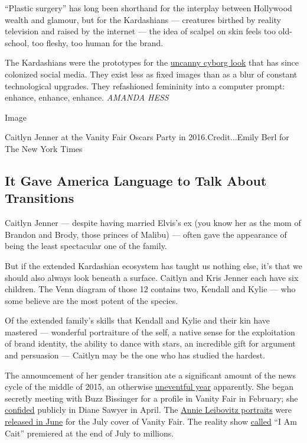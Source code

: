 ``Plastic surgery'' has long been shorthand for the interplay between
Hollywood wealth and glamour, but for the Kardashians --- creatures
birthed by reality television and raised by the internet --- the idea of
scalpel on skin feels too old-school, too fleshy, too human for the
brand.

The Kardashians were the prototypes for the
\href{https://www.nytimes3xbfgragh.onion/2018/02/04/arts/fembot-poppy-lil-miquela-kylie-jenner.html}{uncanny
cyborg look} that has since colonized social media. They exist less as
fixed images than as a blur of constant technological upgrades. They
refashioned femininity into a computer prompt: enhance, enhance,
enhance. \emph{AMANDA HESS}

Image

Caitlyn Jenner at the Vanity Fair Oscars Party in 2016.Credit...Emily
Berl for The New York Times

\hypertarget{it-gave-america-language-to-talk-about-transitions}{%
\subsection{It Gave America Language to Talk About
Transitions}\label{it-gave-america-language-to-talk-about-transitions}}

Caitlyn Jenner --- despite having married Elvis's ex (you know her as
the mom of Brandon and Brody, those princes of Malibu) --- often gave
the appearance of being the least spectacular one of the family.

But if the extended Kardashian ecosystem has taught us nothing else,
it's that we should also always look beneath a surface. Caitlyn and Kris
Jenner each have six children. The Venn diagram of those 12 contains
two, Kendall and Kylie --- who some believe are the most potent of the
species.

Of the extended family's skills that Kendall and Kylie and their kin
have mastered --- wonderful portraiture of the self, a native sense for
the exploitation of brand identity, the ability to dance with stars, an
incredible gift for argument and persuasion --- Caitlyn may be the one
who has studied the hardest.

The announcement of her gender transition ate a significant amount of
the news cycle of the middle of 2015, an otherwise
\href{https://www.nytimes3xbfgragh.onion/interactive/2015/02/28/science/white-or-blue-dress.html}{uneventful
year} apparently. She began secretly meeting with Buzz Bissinger for a
profile in Vanity Fair in February; she
\href{https://www.nytimes3xbfgragh.onion/2015/04/25/business/media/bruce-jenner-says-he-identifies-as-a-woman.html}{confided}
publicly in Diane Sawyer in April. The
\href{https://www.vanityfair.com/hollywood/2015/06/caitlyn-jenner-bruce-cover-annie-leibovitz}{Annie
Leibovitz portraits} were
\href{https://www.nytimes3xbfgragh.onion/2015/06/02/business/media/jenner-reveals-new-name-in-vanity-fair-article.html}{released
in June} for the July cover of Vanity Fair. The reality show
\href{https://www.nytimes3xbfgragh.onion/2016/08/17/arts/television/i-am-cait-has-been-canceled.html}{called}
``I Am Cait'' premiered at the end of July to millions.

